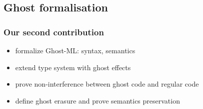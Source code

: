 \documentclass[xcolor=dvipsnames]{beamer}
\newcommand{\rouge}[1]{\textcolor{red}{#1}}
\newcommand{\bwedge}{\boldsymbol{~\wedge~}}
\newcommand{\bvee}{\boldsymbol{~\vee~}}
\newcommand{\gb}{\beta}
\newcommand{\gba}[1]{\beta_{#1}}
\newcommand{\gbt}{\top_\beta}
\newcommand{\gbr}{\textcolor{red}{\gb}}
\newcommand{\gbra}[1]{\textcolor{red}{\gba{#1}}}
\newcommand{\gbtr}{\textcolor{red}{\gbt}}
\newcommand{\gbran}[1]{\textcolor{red}{\neg\gba{#1}}}
\newcommand{\bth}{\bot_\theta}
\newcommand{\brh}{\bot_\rho}
\newcommand{\ghosttyping}[6]{\vdash_{gh}~#1~:~#2,~(#3,~#4,~\rouge{#5})~\textcolor{blue}{\boldsymbol{#6}}}
\begin{document}
\subsection*{Ghost formalisation}


\begin{frame}
\frametitle{Our second contribution}
\begin{itemize}
\item formalize {\red Ghost-ML}: syntax, semantics 
\item extend type system with {\red ghost effects} \pause
\item prove {\red non-interference} between ghost code and regular code \pause
\item define ghost {\red erasure} and prove {\red semantics preservation}
\end{itemize}
\end{frame}

%
%
%
\end{document}
